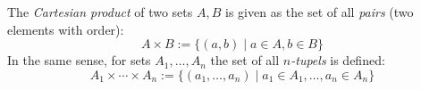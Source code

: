 \begin{Definition}
 The \emph{Cartesian product} of two sets $A,B$ is
 given as the set of all \emph{pairs} (two elements with order):
 	$$
 		A \times B
 		:=  \{ (a,b) \mid a \in A, b \in B\}
 	$$
 In the same sense, for sets $A_1, \ldots, A_n$
 the set of all \emph{$n$-tupels} is defined:
  	$$
 		A_1 \times \cdots \times
 		A_n
 		:=  \{ (a_1,\ldots, a_n) \mid a_1 \in A_1, \ldots, a_n \in A_n\}
 	$$
\end{Definition}
